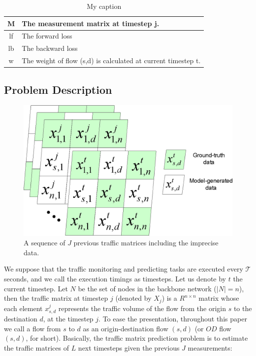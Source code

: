 \begin{table}[]
\begin{tabular}{|c|l|}
M                   & The measurement matrix at timestep j.                                                                                                                                    \\ \hline
lf                  & The forward loss                                                                                                                                                         \\ \hline
lb                  & The backward loss                                                                                                                                                        \\ \hline
w                   & The weight of flow (s,d) is calculated at current timestep t.                                                                                                            \\ \hline
\end{tabular}
\caption{My caption}
\label{my-label}
\end{table}


\subsection{Problem Description}
\label{subsec:problem_description}

\begin{figure}
\centering
		\includegraphics[width=0.65\columnwidth]{preliminaries_figs/traffic_matrices.eps}
		\caption{A sequence of $J$ previous traffic matrices including the imprecise data. \label{fig:traffic_matrices}}
\end{figure}

We suppose that the traffic monitoring and predicting tasks are executed every $\mathcal{T}$ seconds, and we call the execution timings as timesteps.
Let us denote by $t$ the current timestep.
Let $N$ be the set of nodes in the backbone network ($\left |  N \right |=n$), then the traffic matrix at timestep $j$ (denoted by $X_j$) is a $R^{n \times n}$ matrix whose each element $x_{s,d}^j$ represents the traffic volume of the flow from the origin $s$ to the destination $d$, at the timestep $j$.
To ease the presentation, throughout this paper we call a flow from $s$ to $d$ as an origin-destination flow $(s,d)$ (or $OD$ flow $(s,d)$, for short). 
Basically, the traffic matrix prediction problem is to estimate the traffic matrices of $L$ next timesteps given the previous $J$ measurements:

